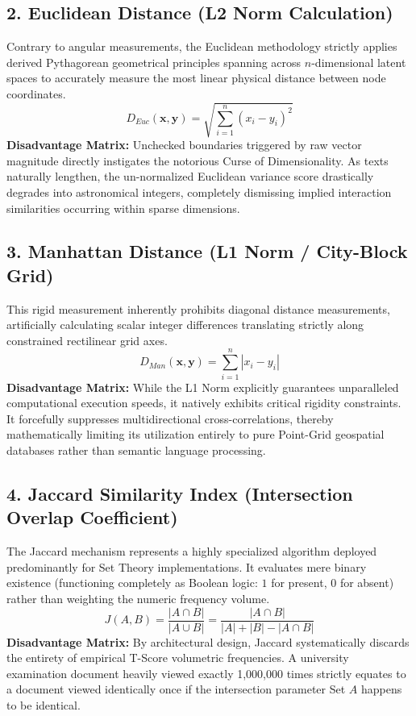 \documentclass[journal]{IEEEtran}
\begin{document}
\subsection{2. Euclidean Distance (L2 Norm Calculation)}

Contrary to angular measurements, the Euclidean methodology strictly applies derived Pythagorean geometrical principles spanning across $n$-dimensional latent spaces to accurately measure the most linear physical distance between node coordinates.
\begin{equation}
\label{eq:euclidean_baseline}
D_{Euc}(\mathbf{x}, \mathbf{y}) = \sqrt{\sum_{i=1}^{n} (x_i - y_i)^2}
\end{equation}
\textbf{Disadvantage Matrix:} Unchecked boundaries triggered by raw vector magnitude directly instigates the notorious Curse of Dimensionality. As texts naturally lengthen, the un-normalized Euclidean variance score drastically degrades into astronomical integers, completely dismissing implied interaction similarities occurring within sparse dimensions.

\subsection{3. Manhattan Distance (L1 Norm / City-Block Grid)}

This rigid measurement inherently prohibits diagonal distance measurements, artificially calculating scalar integer differences translating strictly along constrained rectilinear grid axes.
\begin{equation}
\label{eq:manhattan_baseline}
D_{Man}(\mathbf{x}, \mathbf{y}) = \sum_{i=1}^{n} |x_i - y_i|
\end{equation}
\textbf{Disadvantage Matrix:} While the L1 Norm explicitly guarantees unparalleled computational execution speeds, it natively exhibits critical rigidity constraints. It forcefully suppresses multidirectional cross-correlations, thereby mathematically limiting its utilization entirely to pure Point-Grid geospatial databases rather than semantic language processing.

\subsection{4. Jaccard Similarity Index (Intersection Overlap Coefficient)}

The Jaccard mechanism represents a highly specialized algorithm deployed predominantly for Set Theory implementations. It evaluates mere binary existence (functioning completely as Boolean logic: $1$ for present, $0$ for absent) rather than weighting the numeric frequency volume.
\begin{equation}
\label{eq:jaccard_baseline}
J(A, B) = \frac{|A \cap B|}{|A \cup B|} = \frac{|A \cap B|}{|A| + |B| - |A \cap B|}
\end{equation}
\textbf{Disadvantage Matrix:} By architectural design, Jaccard systematically discards the entirety of empirical T-Score volumetric frequencies. A university examination document heavily viewed exactly 1,000,000 times strictly equates to a document viewed identically once if the intersection parameter Set $A$ happens to be identical.
\end{document}
